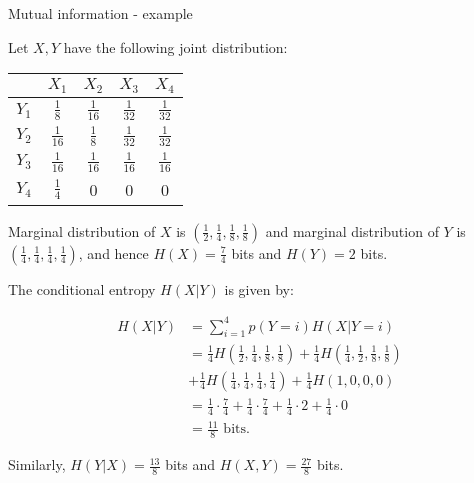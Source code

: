 \documentclass[11pt,compress,t,notes=noshow, xcolor=table]{beamer}
\begin{document}
\begin{vbframe} {Mutual information - example}

Let $X, Y$ have the following joint distribution:

\begin{table}[]
  \begin{tabular}{c|c|c|c|c|}
    & $X_1$ & $X_2$ & $X_3$ & $X_4$ \\ 
    \hline
    $Y_1$ & $\frac{1}{8}$ & $\frac{1}{16}$ & $\frac{1}{32}$ & $\frac{1}{32}$ \\
    \hline
    $Y_2$ & $\frac{1}{16}$ & $\frac{1}{8}$ & $\frac{1}{32}$ & $\frac{1}{32}$ \\
    \hline
    $Y_3$ & $\frac{1}{16}$ & $\frac{1}{16}$ & $\frac{1}{16}$ & $\frac{1}{16}$ \\
    \hline
    $Y_4$ & $\frac{1}{4}$ & 0 & 0 & 0 \\
    \hline
  \end{tabular}
\end{table}

\lz

Marginal distribution of $X$ is $(\frac{1}{2}, \frac{1}{4}, \frac{1}{8}, \frac{1}{8})$ and marginal distribution of $Y$ is $(\frac{1}{4}, \frac{1}{4}, \frac{1}{4}, \frac{1}{4})$, and hence $H(X) = \frac{7}{4}$ bits and $H(Y) = 2$ bits.

\framebreak

The conditional entropy $H(X|Y)$ is given by:

\begin{equation*}
  \begin{aligned}
    H(X|Y) &= \sum_{i = 1}^4 p(Y = i) H(X | Y = i) \\
    &= \frac{1}{4} H \left( \frac{1}{2}, \frac{1}{4}, \frac{1}{8}, \frac{1}{8} \right) +     \frac{1}{4} H \left( \frac{1}{4}, \frac{1}{2}, \frac{1}{8}, \frac{1}{8} \right) \\
    &+ \frac{1}{4} H \left( \frac{1}{4}, \frac{1}{4}, \frac{1}{4}, \frac{1}{4} \right) +     \frac{1}{4} H \left(1,0,0,0 \right) \\
    &=  \frac{1}{4} \cdot \frac{7}{4} + \frac{1}{4} \cdot \frac{7}{4} + \frac{1}{4} \cdot     2 + \frac{1}{4} \cdot 0 \\
    &= \frac{11}{8} \text{ bits}.
  \end{aligned}
\end{equation*}

Similarly, $H(Y|X) = \frac{13}{8}$ bits and $H(X,Y) = \frac{27}{8}$ bits.

\end{vbframe}


\endlecture
\end{document}
